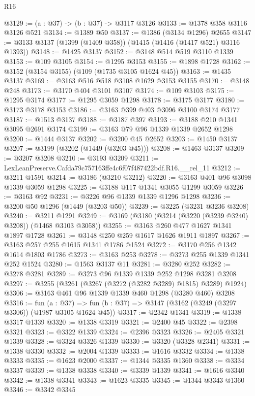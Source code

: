 \begin{lexlean}{R16}
\begin{coremodule}
@3129 := (a : @37) -> (b : @37) -> @3117 @3126
@3133 := @1378 @358 @3116 @3126 @521
@3134 := @1389 @50
@3137 := @1386 (@3134 @1296) @2655
@3147 := @3133 @3137 (@1399 (@1409 @358)) (@1415 (@1416 (@1417 @521) @3116 @1393))
@3148 := @1425 @3137
@3152 := @3148 @514 @519 @3110 @1339
@3153 := @109 @3105
@3154 := @1295 @3153
@3155 := @1898 @1728
@3162 := @3152 (@3154 @3155) (@109 (@1735 @3105 @1624 @45))
@3163 := @1435 @3137
@3169 := @3163 @516 @518 @3108 @1629 @3153 @3155
@3170 := @3148 @248
@3173 := @3170 @404 @3101 @3107
@3174 := @109 @3103
@3175 := @1295 @3174
@3177 := @1295 @3059 @1298
@3178 := @3175 @3177
@3180 := @3173 @3178 @3153
@3186 := @3163 @399 @403 @3096 @3100 @3174 @3177
@3187 := @1513 @3137
@3188 := @3187 @397
@3193 := @3188 @210 @1341 @3095 @2691 @3174
@3199 := @3163 @79 @96 @1339 @1339 @2652 @1298
@3200 := @1444 @3137
@3202 := @3200 @45 @2652
@3203 := @1450 @3137
@3207 := @3199 (@3202 (@1449 (@3203 @45)))
@3208 := @1463 @3137
@3209 := @3207 @3208
@3210 := @3193 @3209
@3211 := LexLeanPreserve.Cafda79c757163ffe4c6f07f487422bdf.R16.__rel_11
@3212 := @3211 @1591
@3214 := @3186 (@3210 @3212)
@3220 := @3163 @401 @96 @3098 @1339 @3059 @1298
@3225 := @3188 @117 @1341 @3055 @1299 @3059
@3226 := @3163 @92
@3231 := @3226 @96 @1339 @1339 @1296 @1298
@3236 := @3200 @50 @1296 (@1449 (@3203 @50))
@3239 := @3225 (@3231 @3236 @3208)
@3240 := @3211 @1291
@3249 := @3169 (@3180 (@3214 (@3220 (@3239 @3240) @3208)) (@1468 @3103 @3058))
@3255 := @3163 @260 @477 @1627 @1341 @1897 @1728
@3261 := @3148 @250 @259 @1617 @1626 @1911 @1897
@3267 := @3163 @257 @255 @1615 @1341 @1786 @1524
@3272 := @3170 @256 @1342 @1614 @1803 @1786
@3273 := @3163 @253
@3278 := @3273 @255 @1339 @1341 @252 @1524
@3280 := @1563 @3137 @11
@3281 := @3280 @252
@3282 := @3278 @3281
@3289 := @3273 @96 @1339 @1339 @252 @1298 @3281 @3208
@3297 := @3255 (@3261 (@3267 (@3272 (@3282 @3289) @1815) @3289) @1924)
@3306 := @3163 @461 @96 @1339 @1339 @460 @1298 (@3280 @460) @3208
@3316 := fun (a : @37) =>
  fun (b : @37) => @3147 (@3162 (@3249 (@3297 @3306)) (@1987 @3105 @1624 @45))
@3317 := @2342 @1341
@3319 := @1338 @3317 @1339
@3320 := @1338 @3319
@3321 := @2400 @45
@3322 := @2398 @3321
@3323 := @3322 @1339
@3324 := @2396 @3323
@3326 := @2405 @3321 @1339
@3328 := @3324 @3326 @1339
@3330 := @3320 (@3328 @2341)
@3331 := @1338 @3330
@3332 := @2004 @1339
@3333 := @1616 @3332
@3334 := @1338 @3333
@3335 := @1623 @2000
@3337 := @1344 @3335 @1360
@3338 := @3334 @3337
@3339 := @1338 @3338
@3340 := @3339 @1339
@3341 := @1616 @3340
@3342 := @1338 @3341
@3343 := @1623 @3335
@3345 := @1344 @3343 @1360
@3346 := @3342 @3345

\end{coremodule}
\end{lexlean}
